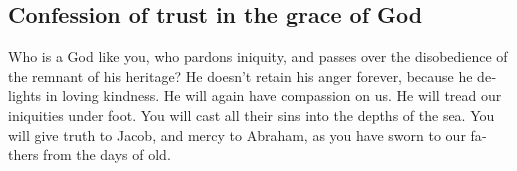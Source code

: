 \begin{paracol}{2}
\begin{otherlanguage}{english}
\hypertarget{confession-of-trust-in-the-grace-of-god}{%
\subsection{Confession of trust in the grace of
God}\label{confession-of-trust-in-the-grace-of-god}}

 Who is a God like you, who pardons iniquity, and passes
over the disobedience of the remnant of his heritage? He doesn't retain
his anger forever, because he delights in loving kindness.
 He will again have compassion on us. He will tread our
iniquities under foot. You will cast all their sins into the depths of
the sea.  You will give truth to Jacob, and mercy to
Abraham, as you have sworn to our fathers from the days of old.
\end{otherlanguage} \end{paracol}
